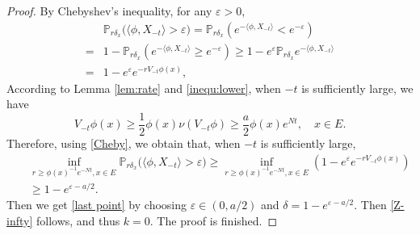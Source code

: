 \documentclass[12pt,a4paper]{amsart}
\numberwithin{equation}{section}
\theoremstyle{plain}
\theoremstyle{definition}
\theoremstyle{remark}
\begin{document}
\begin{proof}
	By Chebyshev's inequality, for any $\varepsilon>0$,
	\begin{align}
	&\mathbb P_{r\delta_x}\big(\langle\phi, X_{-t}\rangle >\varepsilon\big)=\mathbb P_{r\delta_x}\left(e^{-\langle\phi, X_{-t}\rangle }<e^{-\varepsilon}\right)\\
	=&1-\mathbb P_{r\delta_x}\left(e^{-\langle\phi, X_{-t}
		\rangle }\geq e^{-\varepsilon}\right)\geq 1-e^{\varepsilon }\mathbb P_{r\delta_x}e^{-\langle\phi, X_{-t}\rangle }\\
	=&1-e^{\varepsilon }e^{-rV_{-t}\phi(x)},\label{Cheby}
	\end{align}
	According to Lemma \ref{lem:rate} and \eqref{inequ:lower}, 
	when $-t$ is sufficiently large, we have
	\[
	V_{-t}\phi(x)\ge\frac{1}{2}\phi(x)\nu(V_{-t}\phi)\geq \dfrac{a}{2}\phi(x)e^{Nt},\quad x\in E.
	\]
	Therefore, using \eqref{Cheby}, we obtain that, when $-t$ is sufficiently large,
	\begin{eqnarray*}
		&&\inf_{r\geq \phi(x)^{-1}e^{-Nt}, x\in E}\mathbb P_{r\delta_x}\big(\langle\phi, X_{-t} \rangle >\varepsilon\big)\geq \inf_{r\geq \phi(x)^{-1}e^{-Nt}, x\in E} \left(1-e^{\varepsilon}e^{-rV_{-t}\phi(x)}\right)\\ 
		&&     \geq 1-e^{\varepsilon-a/2}.
	\end{eqnarray*}
	Then we get \eqref{last point} by	choosing $\varepsilon\in(0, a/2)$ and $\delta=1-e^{\varepsilon-a/2}$.  Then
	\eqref{Z-infty} follows, and thus $k=0$. The proof is finished.
\end{proof}
\end{document}
